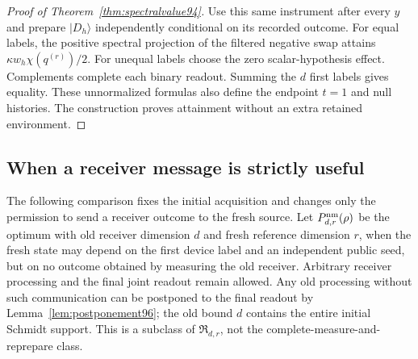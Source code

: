 \begin{proof}[Proof of Theorem~\ref{thm:spectralvalue94}]
Use this same instrument after every $y$ and prepare $|D_h\rangle$
independently conditional on its recorded outcome.  For equal labels,
the positive spectral projection of the filtered negative swap attains
$\kappa w_h\chi(q^{(r)})/2$.  For unequal labels choose the zero
scalar-hypothesis effect.  Complements complete each binary readout.
Summing the $d$ first labels gives equality.  These unnormalized
formulas also define the endpoint $t=1$ and null histories.  The
construction proves attainment without an extra retained environment.
\end{proof}

\subsection{When a receiver message is strictly useful}
The following comparison fixes the initial acquisition and changes
only the permission to send a receiver outcome to the fresh source.
Let $P_{d,r}^{\rm nm}(\rho)$ be the optimum with old receiver dimension
$d$ and fresh reference dimension $r$, when the fresh state may depend
on the first device label and an independent public seed, but on no
outcome obtained by measuring the old receiver.  Arbitrary receiver
processing and the final joint readout remain allowed.  Any old
processing without such communication can be postponed to the final
readout by Lemma~\ref{lem:postponement96}; the old bound $d$ contains
the entire initial Schmidt support.  This is a subclass of $\mathfrak R_{d,r}$, not the
complete-measure-and-reprepare class.

